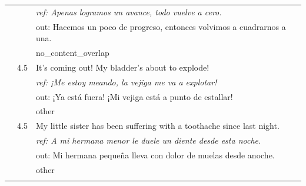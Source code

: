 \begin{longtable}{@{}rp{0.7cm}p{11cm}@{}}
& & \small\itshape ref: Apenas logramos un avance, todo vuelve a cero. \\
& & \small\ttfamily out: Hacemos un poco de progreso, entonces volvimos a cuadrarnos a una. \\
& & \scriptsize no\_content\_overlap \\\addlinespace
19 & 4.5 & \small It's coming out! My bladder's about to explode! \\
& & \small\itshape ref: ¡Me estoy meando, la vejiga me va a explotar! \\
& & \small\ttfamily out: ¡Ya está fuera! ¡Mi vejiga está a punto de estallar! \\
& & \scriptsize other \\\addlinespace
20 & 4.5 & \small My little sister has been suffering with a toothache since last night. \\
& & \small\itshape ref: A mi hermana menor le duele un diente desde esta noche. \\
& & \small\ttfamily out: Mi hermana pequeña lleva con dolor de muelas desde anoche. \\
& & \scriptsize other \\\addlinespace
\bottomrule
\end{longtable}

